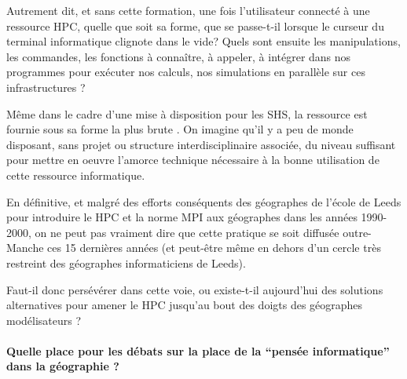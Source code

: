 Autrement dit, et sans cette formation, une fois l'utilisateur connecté à une ressource HPC, quelle que soit sa forme, que se passe-t-il lorsque le curseur du terminal informatique clignote dans le vide? Quels sont ensuite les manipulations, les commandes, les fonctions à connaître, à appeler, à intégrer dans nos programmes pour exécuter nos calculs, nos simulations en parallèle sur ces infrastructures ?

Même dans le cadre d'une mise à disposition pour les SHS, la ressource est fournie sous sa forme la plus brute . On imagine qu'il y a peu de monde disposant, sans projet ou structure interdisciplinaire associée, du niveau suffisant pour mettre en oeuvre l'amorce technique nécessaire à la bonne utilisation de cette ressource informatique.

En définitive, et malgré des efforts conséquents des géographes de l'école de Leeds \autocite{Openshaw2000} pour introduire le HPC et la norme MPI aux géographes dans les années 1990-2000, on ne peut pas vraiment dire que cette pratique se soit diffusée outre-Manche ces 15 dernières années (et peut-être même en dehors d'un cercle très restreint des géographes informaticiens de Leeds).

Faut-il donc persévérer dans cette voie, ou existe-t-il aujourd'hui des solutions alternatives pour amener le HPC jusqu'au bout des doigts des géographes modélisateurs ?







\paragraph{Quelle place pour les débats sur la place de la \enquote{pensée informatique} dans la géographie ?}
\label{p:Tournantenseignements}

